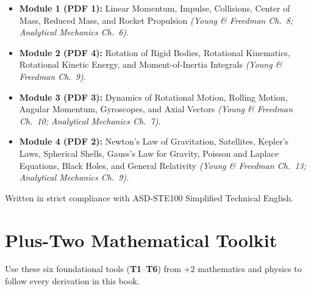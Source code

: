 \documentclass[11pt,a4paper,openany,oneside]{book}
\numberwithin{equation}{chapter}
\newcounter{tool}
\begin{document}
\begin{titlepage}
\begin{tcolorbox}[common,colback=slatesoft,colframe=teal,borderline west={3pt}{0pt}{teal},title={SYLLABUS \& SOURCE COVERAGE}]
\begin{itemize}
  \item \textbf{Module 1 (PDF 1):} Linear Momentum, Impulse, Collisions, Center of Mass, Reduced Mass, and Rocket Propulsion \emph{(Young \& Freedman Ch.\ 8; Analytical Mechanics Ch.\ 6)}.
  \item \textbf{Module 2 (PDF 4):} Rotation of Rigid Bodies, Rotational Kinematics, Rotational Kinetic Energy, and Moment-of-Inertia Integrals \emph{(Young \& Freedman Ch.\ 9)}.
  \item \textbf{Module 3 (PDF 3):} Dynamics of Rotational Motion, Rolling Motion, Angular Momentum, Gyroscopes, and Axial Vectors \emph{(Young \& Freedman Ch.\ 10; Analytical Mechanics Ch.\ 7)}.
  \item \textbf{Module 4 (PDF 2):} Newton's Law of Gravitation, Satellites, Kepler's Laws, Spherical Shells, Gauss's Law for Gravity, Poisson and Laplace Equations, Black Holes, and General Relativity \emph{(Young \& Freedman Ch.\ 13; Analytical Mechanics Ch.\ 9)}.
\end{itemize}
\end{tcolorbox}
\vfill
{\small{}\selectfont\color{slate} Written in strict compliance with ASD-STE100 Simplified Technical English.\par}
\end{titlepage}

\tableofcontents

\chapter*{Plus-Two Mathematical Toolkit}

\begin{syll}
Use these six foundational tools (\textbf{T1}--\textbf{T6}) from $+2$ mathematics and physics to follow every derivation in this book.
\end{syll}
\end{document}
